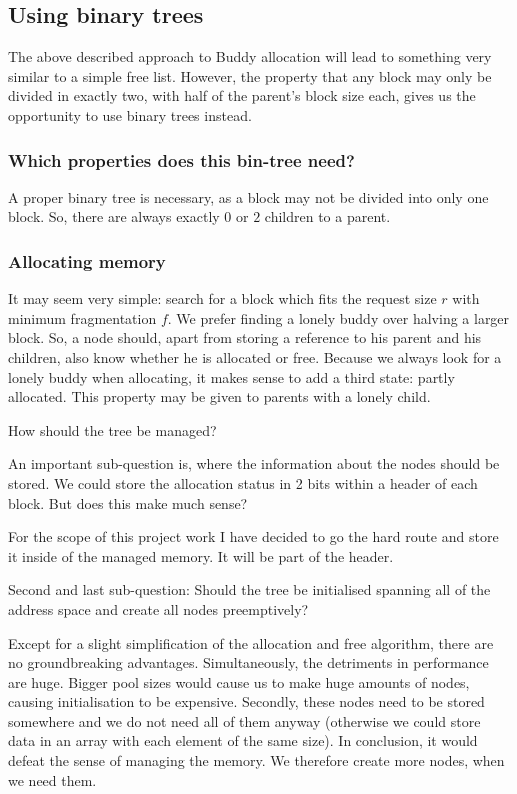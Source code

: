 \documentclass[runningheads]{llncs}
\begin{document}
\subsection{Using binary trees} The above described approach to Buddy allocation
will lead to something very similar to a simple free list.
However, the property that any block may only be divided in exactly two, with
half of the parent's block size each, gives us the opportunity to use binary
trees instead.

\subsubsection{Which properties does this bin-tree need?}
A proper binary tree is necessary, as a block may not be divided into only one
block. So, there are always exactly $0$ or $2$ children to a parent.

\subsubsection{Allocating memory}
It may seem very simple: search for a block which fits the request size $r$
with minimum fragmentation $f$. We prefer finding a lonely buddy over halving
a larger block. So, a node should, apart from storing a reference to his parent
and his children, also know whether he is allocated or free. Because we always
look for a lonely buddy when allocating, it makes sense to add a third state:
partly allocated. This property may be given to parents with a lonely child.

\begin{problem}
    How should the tree be managed?

    An important sub-question is, where the information about the nodes should
    be stored. We could store the allocation status in 2 bits within a header
    of each block. But does this make much sense?

    For the scope of this project work I have decided to go the hard route and
    store it inside of the managed memory. It will be part of the header.

    Second and last sub-question: Should the tree be initialised spanning
    all of the address space and create all nodes preemptively?
    
    Except for a slight simplification of the allocation and free algorithm,
    there are no groundbreaking advantages. Simultaneously, the detriments in
    performance are huge. Bigger pool sizes would cause us to make huge 
    amounts of nodes, causing initialisation to be expensive. Secondly,
    these nodes need to be stored somewhere and we do not need all
    of them anyway (otherwise we could store data in an array with each
    element of the same size). In conclusion, it would defeat the sense of
    managing the memory. We therefore create more nodes, when we need them.
\end{problem}
\end{document}
